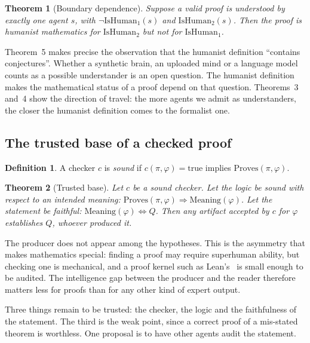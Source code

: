 \documentclass[11pt]{article}
\newtheorem{theorem}{Theorem}
\theoremstyle{definition}
\newtheorem{definition}{Definition}
\theoremstyle{remark}
\begin{document}
\begin{theorem}[Boundary dependence]
Suppose a valid proof is understood by exactly one agent $s$, with
$\neg\mathrm{IsHuman}_1(s)$ and $\mathrm{IsHuman}_2(s)$. Then the proof is humanist mathematics
for $\mathrm{IsHuman}_2$ but not for $\mathrm{IsHuman}_1$.
\end{theorem}

Theorem~5 makes precise the observation that the humanist definition ``contains conjectures''.
Whether a synthetic brain, an uploaded mind or a language model counts as a possible
understander is an open question. The humanist definition makes the mathematical status of a
proof depend on that question. Theorems~3 and~4 show the direction of travel: the more agents
we admit as understanders, the closer the humanist definition comes to the formalist one.

\subsection{The trusted base of a checked proof}

\begin{definition}
A checker $c$ is \emph{sound} if $c(\pi,\varphi) = \mathrm{true}$ implies
$\mathrm{Proves}(\pi,\varphi)$.
\end{definition}

\begin{theorem}[Trusted base]
Let $c$ be a sound checker. Let the logic be sound with respect to an intended meaning:
$\mathrm{Proves}(\pi,\varphi) \Rightarrow \mathrm{Meaning}(\varphi)$. Let the statement be faithful:
$\mathrm{Meaning}(\varphi) \Leftrightarrow Q$. Then any artifact accepted by $c$ for
$\varphi$ establishes $Q$, whoever produced it.
\end{theorem}

The producer does not appear among the hypotheses. This is the asymmetry that makes mathematics
special: finding a proof may require superhuman ability, but checking one is mechanical, and a
proof kernel such as Lean's~\cite{lean4} is small enough to be audited. The intelligence gap
between the producer and the reader therefore matters less for proofs than for any other kind
of expert output.

Three things remain to be trusted: the checker, the logic and the faithfulness of the statement.
The third is the weak point, since a correct proof of a mis-stated theorem is worthless. One
proposal is to have other agents audit the statement.
\end{document}

